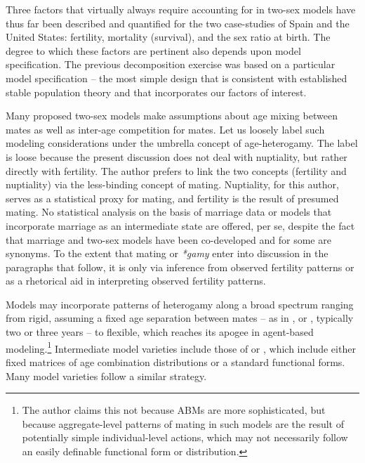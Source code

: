 \FloatBarrier
Three factors that virtually always require accounting for in two-sex models
have thus far been described and quantified for the two case-studies of Spain and
the United States: fertility, mortality (survival), and the sex ratio at birth.
The degree to which these factors are pertinent also depends upon model 
specification. The previous decomposition exercise was based on a particular
model specification -- the most simple design that is consistent with
established stable population theory and that incorporates our factors of
interest. 

Many proposed two-sex models make assumptions about age mixing between
mates as well as inter-age competition for mates. Let us loosely 
label such modeling considerations under the umbrella concept of
age-heterogamy. The label is loose because the present
discussion does not deal with nuptiality, but rather directly with fertility.
The author prefers to link the two concepts (fertility and nuptiality) via
the less-binding concept of mating. Nuptiality, for this author, serves as a
statistical proxy for mating, and fertility is the result of presumed mating. No 
statistical analysis on the basis of
marriage data or models that incorporate marriage as an intermediate state are
offered, per se, despite the fact that marriage and two-sex models have
been co-developed and for some are synonyms. To the extent that mating or
\textit{*gamy} enter into discussion in the paragraphs that follow, it is only
via inference from observed fertility patterns or as a rhetorical aid in interpreting observed fertility patterns.

Models may incorporate patterns of heterogamy along a
broad spectrum ranging from rigid, assuming a fixed age separation between mates
-- as in \citet{cabre1997tortulos}, \citet{karmel1947relations} or \citet{akers1967measuring}, 
 typically two or three years -- to flexible, which reaches its apogee in
 agent-based modeling.\footnote{The author claims this not because ABMs are more
sophisticated, but because aggregate-level patterns of mating in such models are
the result of potentially simple individual-level actions, which may not
necessarily follow an easily definable functional form or distribution.}
Intermediate model varieties include those of \citet[e.g.][]{gupta1972two} or
\citet{schoen1981harmonic}, which include either fixed matrices of age
combination distributions or a standard functional forms. Many model varieties
follow a similar strategy.  

